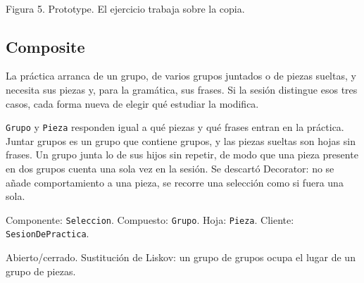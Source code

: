 \documentclass[11pt]{article}
\begin{document}
\begin{center}
\\[0.3em]
{\small Figura 5. Prototype. El ejercicio trabaja sobre la copia.}
\end{center}

\subsection{Composite}

\begin{description}
  \raggedright
  \item[Problema.] La práctica arranca de un grupo, de varios grupos juntados o de piezas sueltas, y necesita sus piezas y, para la gramática, sus frases. Si la sesión distingue esos tres casos, cada forma nueva de elegir qué estudiar la modifica.
  \item[Solución.] \texttt{Grupo} y \texttt{Pieza} responden igual a qué piezas y qué frases entran en la práctica. Juntar grupos es un grupo que contiene grupos, y las piezas sueltas son hojas sin frases. Un grupo junta lo de sus hijos sin repetir, de modo que una pieza presente en dos grupos cuenta una sola vez en la sesión. Se descartó Decorator: no se añade comportamiento a una pieza, se recorre una selección como si fuera una sola.
  \item[Participantes.] Componente: \texttt{Seleccion}. Compuesto: \texttt{Grupo}. Hoja: \texttt{Pieza}. Cliente: \texttt{SesionDePractica}.
  \item[SOLID.] Abierto/cerrado. Sustitución de Liskov: un grupo de grupos ocupa el lugar de un grupo de piezas.
\end{description}
\end{document}
